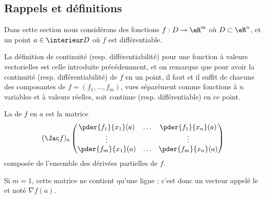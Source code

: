 \subsection{Rappels et définitions}

Dans cette section nous considérons des fonctions $f : D \to \eR^m$
où $D \subset \eR^n$, et un point $a \in \interieur D$ où $f$ est
différentiable.
\begin{remark}
  La définition de continuité (resp. différentiabilité) pour une
  fonction à valeurs vectorielles est celle introduite précédemment,
  et on remarque que pour avoir la continuité
  (resp. différentiabilité) de $f$ en un point, il faut et il suffit
  de chacune des composantes de $f = (f_1,\ldots, f_m)$, vues
  séparément comme fonctions à $n$ variables et à valeurs réelles,
  soit continue (resp. différentiable) en ce point.
\end{remark}

\begin{definition}La  de $f$ en $a$ est la matrice
  \begin{equation*}
    (\Jac f)_a \begin{pmatrix}
      \pder {f_1} {x_1}(a) & \ldots &\pder {f_1} {x_n}(a)\\
      \vdots& & \vdots\\
      \pder {f_m} {x_1}(a) & \ldots &\pder {f_m} {x_n}(a)
    \end{pmatrix}
  \end{equation*}
  composée de l'ensemble des dérivées partielles de $f$.

  Si $m = 1$, cette matrice ne contient qu'une ligne ; c'est donc un
  vecteur appelé le  et noté $\nabla f(a)$.
\end{definition}

